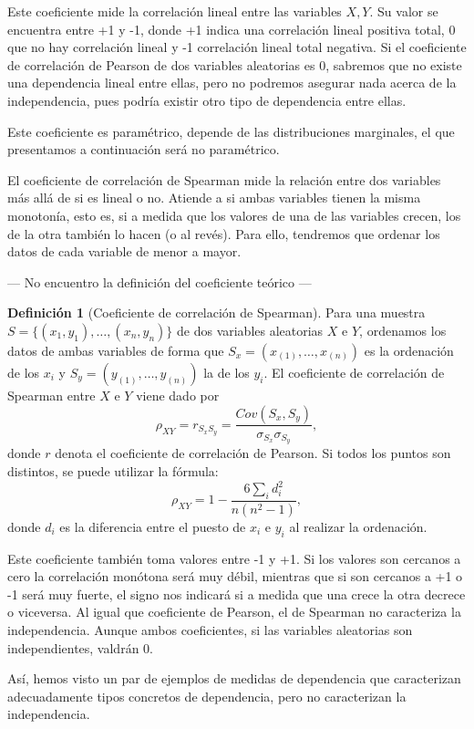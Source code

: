 \documentclass[10pt,a4paper]{article} %
\theoremstyle{definition}
\newtheorem{definition}{Definición}[section]
\begin{document}
Este coeficiente mide la correlación lineal entre las variables $X,Y$. Su valor se encuentra entre +1 y -1, donde +1 indica una correlación lineal positiva total, 0 que no hay correlación lineal y -1 correlación lineal total negativa. Si el coeficiente de correlación de Pearson de dos variables aleatorias es 0, sabremos que no existe una dependencia lineal entre ellas, pero no podremos asegurar nada acerca de la independencia, pues podría existir otro tipo de dependencia entre ellas.

Este coeficiente es paramétrico, depende de las distribuciones marginales, el que presentamos a continuación será no paramétrico.

El coeficiente de correlación de Spearman mide la relación entre dos variables más allá de si es lineal o no. Atiende a si ambas variables tienen la misma monotonía, esto es, si a medida que los valores de una de las variables crecen, los de la otra también lo hacen (o al revés). Para ello, tendremos que ordenar los datos de cada variable de menor a mayor.


--- No encuentro la definición del coeficiente teórico ---
\begin{definition}[Coeficiente de correlación de Spearman]
  Para una muestra $S = \{(x_1,y_1),\dots,(x_n,y_n)\}$ de dos variables aleatorias $X$ e $Y$, ordenamos los datos de ambas variables de forma que $S_x = (x_{(1)},\dots,x_{(n)})$ es la ordenación de los $x_i$ y $S_y = (y_{(1)},\dots,y_{(n)})$ la de los $y_i$. El coeficiente de correlación de Spearman entre $X$ e $Y$ viene dado por\[
\rho_{XY}=r_{S_xS_y}=\frac{Cov(S_x,S_y)}{\sigma_{S_x}\sigma_{S_y}},
\] donde $r$ denota el coeficiente de correlación de Pearson. Si todos los puntos son distintos, se puede utilizar la fórmula:\[
\rho_{XY} = 1 - \frac{6\sum_i d_i^2}{n(n^2-1)},
\]donde $d_i$ es la diferencia entre el puesto de $x_i$ e $y_i$ al realizar la ordenación.
\end{definition}

Este coeficiente también toma valores entre -1 y +1. Si los valores son cercanos a cero la correlación monótona será muy débil, mientras que si son cercanos a +1 o -1 será muy fuerte, el signo nos indicará si a medida que una crece la otra decrece o viceversa. Al igual que coeficiente de Pearson, el de Spearman no caracteriza la independencia. Aunque ambos coeficientes, si las variables aleatorias son independientes, valdrán 0.

Así, hemos visto un par de ejemplos de medidas de dependencia que caracterizan adecuadamente tipos concretos de dependencia, pero no caracterizan la independencia.
\end{document}

